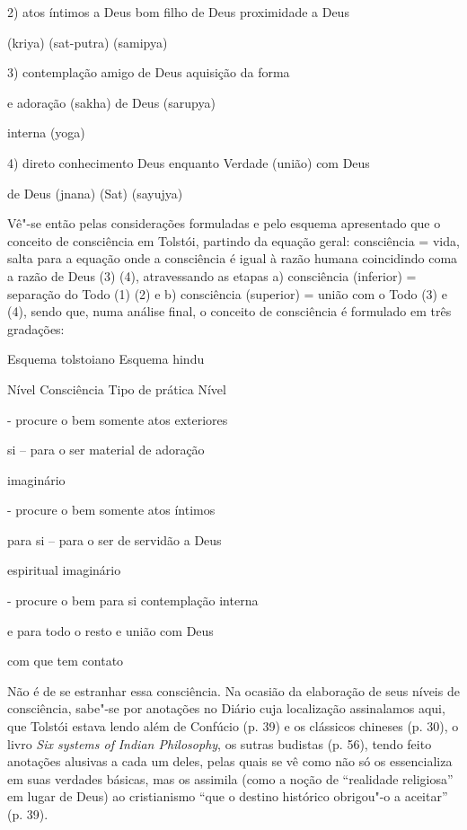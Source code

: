 2) atos íntimos a Deus bom filho de Deus proximidade a Deus

(kriya) (sat-putra) (samipya)

3) contemplação amigo de Deus aquisição da forma

e adoração (sakha) de Deus (sarupya)

interna (yoga)

4) direto conhecimento Deus enquanto Verdade (união) com Deus

de Deus (jnana) (Sat) (sayujya)

Vê"-se então pelas considerações formuladas e pelo esquema apresentado
que o conceito de consciência em Tolstói, partindo da equação geral:
consciência = vida, salta para a equação onde a consciência é igual à
razão humana coincidindo coma a razão de Deus (3) (4), atravessando as
etapas a) consciência (inferior) = separação do Todo (1) (2) e b)
consciência (superior) = união com o Todo (3) e (4), sendo que, numa
análise final, o conceito de consciência é formulado em três gradações:

{Esquema tolstoiano} {Esquema hindu}

Nível Consciência Tipo de prática Nível

 - procure o bem somente atos exteriores 

si -- para o ser material de adoração

imaginário

 - procure o bem somente atos íntimos 

para si -- para o ser de servidão a Deus

espiritual imaginário

 - procure o bem para si contemplação interna 

e para todo o resto e união com Deus

com que tem contato

Não é de se estranhar essa consciência. Na ocasião da elaboração de seus
níveis de consciência, sabe"-se por anotações no Diário cuja localização
assinalamos aqui, que Tolstói estava lendo além de Confúcio (p. 39) e os
clássicos chineses (p. 30), o livro \emph{Six systems of} \emph{Indian
Philosophy}, os sutras budistas (p. 56), tendo feito anotações alusivas
a cada um deles, pelas quais se vê como não só os essencializa em suas
verdades básicas, mas os assimila (como a noção de ``realidade
religiosa'' em lugar de Deus) ao cristianismo ``que o destino histórico
obrigou"-o a aceitar'' (p. 39).

